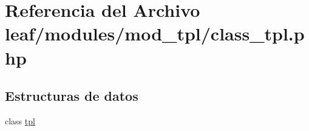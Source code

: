 \hypertarget{class__tpl_8php}{\section{Referencia del Archivo leaf/modules/mod\-\_\-tpl/class\-\_\-tpl.php}
\label{class__tpl_8php}
}
\subsection*{Estructuras de datos}
\begin{DoxyCompactItemize}
\item 
class \hyperlink{classtpl}{tpl}
\end{DoxyCompactItemize}
